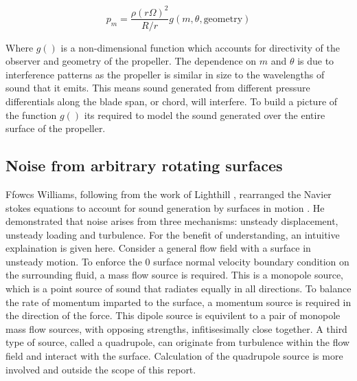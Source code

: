 \documentclass[12pt,a4paper]{article}
\begin{document}
\begin{equation}
    p_m = \frac{\rho (r \Omega)^2}{R/r} g(m, \theta, \text{geometry}) \label{eq:expected_plaw}
\end{equation}

Where $g()$ is a non-dimensional function which accounts for directivity of the observer and geometry of the propeller.
The dependence on $m$ and $\theta$ is due to interference patterns as the propeller is similar in size to the wavelengths of sound that it emits.
This means sound generated from different pressure differentials along the blade span, or chord, will interfere.
To build a picture of the function $g()$ its required to model the sound generated over the entire surface of the propeller.


\subsection{Noise from arbitrary rotating surfaces}
Ffowcs Williams, following from the work of Lighthill \cite{lighthill_1952}, rearranged the Navier stokes equations to account for sound generation by surfaces in motion \cite{ffowcs_1969}.
He demonstrated that noise arises from three mechanisms: unsteady displacement, unsteady loading and turbulence.
For the benefit of understanding, an intuitive explaination is given here.
Consider a general flow field with a surface in unsteady motion.
To enforce the 0 surface normal velocity boundary condition on the surrounding fluid, a mass flow source is required.
This is a monopole source, which is a point source of sound that radiates equally in all directions.
To balance the rate of momentum imparted to the surface, a momentum source is required in the direction of the force.
This dipole source is equivilent to a pair of monopole mass flow sources, with opposing strengths, infitisesimally close together.
A third type of source, called a quadrupole, can originate from turbulence within the flow field and interact with the surface.
Calculation of the quadrupole source is more involved and outside the scope of this report.
\end{document}
